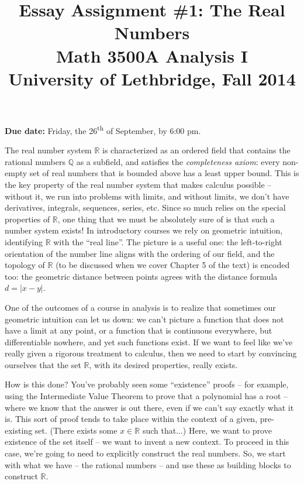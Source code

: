 \documentclass[letterpaper,12pt]{article}
\title{Essay Assignment \#1: The Real Numbers\\Math 3500A Analysis I\\University of Lethbridge, Fall 2014}
\date{}
\newcommand{\R}{\mathbb{R}}
\newcommand{\Q}{\mathbb{Q}}
\begin{document}
\maketitle

 {\bf Due date:} Friday, the 26\textsuperscript{th} of September, by 6:00 pm.

\bigskip

The real number system $\R$ is characterized as an ordered field that contains the rational numbers $\Q$ as a subfield, and satisfies the {\em completeness axiom}: every non-empty set of real numbers that is bounded above has a least upper bound. This is the key property of the real number system that makes calculus possible --  without it, we run into problems with limits, and without limits, we don't have derivatives, integrals, sequences, series, etc. Since so much relies on the special properties of $\R$, one thing that we must be absolutely sure of is that such a number system exists! In introductory courses we rely on geometric intuition, identifying $\R$ with the ``real line''. The picture is a useful one: the left-to-right orientation of the number line aligns with the ordering of our field, and the topology of $\R$ (to be discussed when we cover Chapter 5 of the text) is encoded too: the geometric distance between points agrees with the distance formula $d=\lvert x-y\rvert$.

One of the outcomes of a course in analysis is to realize that sometimes our geometric intuition can let us down: we can't picture a function that does not have a limit at any point, or a function that is continuous everywhere, but differentiable nowhere, and yet such functions exist. If we want to feel like we've really given a rigorous treatment to calculus, then we need to start by convincing ourselves that the set $\R$, with its desired properties, really exists.

How is this done? You've probably seen some ``existence'' proofs -- for example, using the Intermediate Value Theorem to prove that a polynomial has a root -- where we know that the answer is out there, even if we can't say exactly what it is. This sort of proof tends to take place within the context of a given, pre-existing set. (There exists some $x\in\R$ such that...) Here, we want to prove existence of the set itself -- we want to invent a new context. To proceed in this case, we're going to need to explicitly construct the real numbers. So, we start with what we have -- the rational numbers -- and use these as building blocks to construct $\R$.
\end{document}
